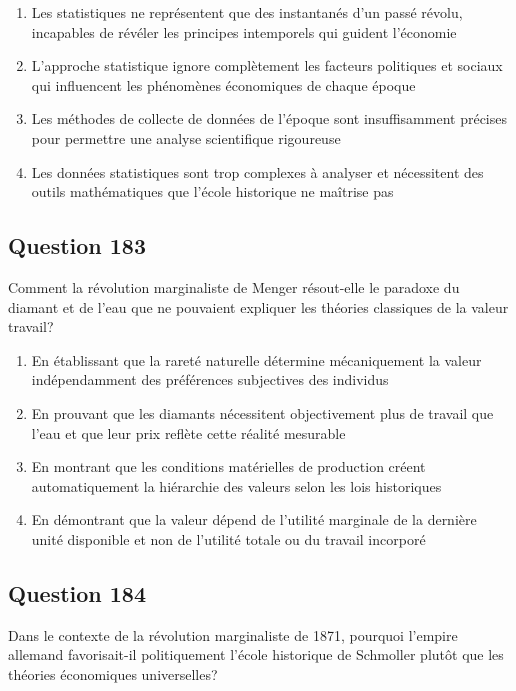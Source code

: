 \documentclass[12pt,a4paper]{article}
\begin{document}
\begin{enumerate}[label=\Alph*., leftmargin=*]
\item Les statistiques ne représentent que des instantanés d'un passé révolu, incapables de révéler les principes intemporels qui guident l'économie
\item L'approche statistique ignore complètement les facteurs politiques et sociaux qui influencent les phénomènes économiques de chaque époque
\item Les méthodes de collecte de données de l'époque sont insuffisamment précises pour permettre une analyse scientifique rigoureuse
\item Les données statistiques sont trop complexes à analyser et nécessitent des outils mathématiques que l'école historique ne maîtrise pas
\end{enumerate}

\bigskip


\subsection*{Question 183}
Comment la révolution marginaliste de Menger résout-elle le paradoxe du diamant et de l'eau que ne pouvaient expliquer les théories classiques de la valeur travail?

\begin{enumerate}[label=\Alph*., leftmargin=*]
\item En établissant que la rareté naturelle détermine mécaniquement la valeur indépendamment des préférences subjectives des individus
\item En prouvant que les diamants nécessitent objectivement plus de travail que l'eau et que leur prix reflète cette réalité mesurable
\item En montrant que les conditions matérielles de production créent automatiquement la hiérarchie des valeurs selon les lois historiques
\item En démontrant que la valeur dépend de l'utilité marginale de la dernière unité disponible et non de l'utilité totale ou du travail incorporé
\end{enumerate}

\bigskip


\subsection*{Question 184}
Dans le contexte de la révolution marginaliste de 1871, pourquoi l'empire allemand favorisait-il politiquement l'école historique de Schmoller plutôt que les théories économiques universelles?
\end{document}
